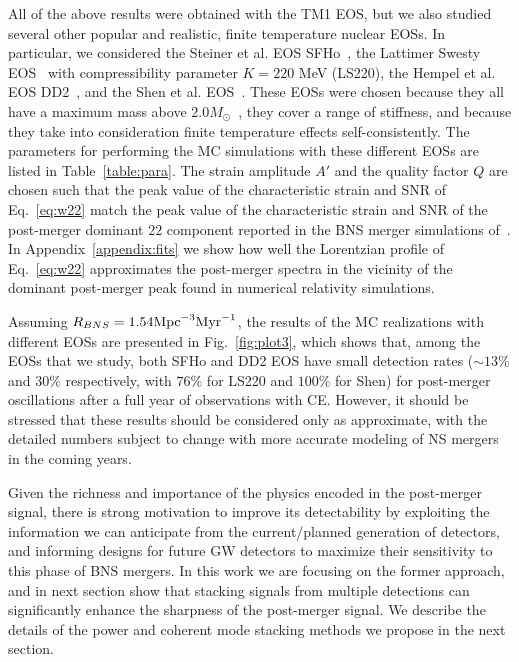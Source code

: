 \documentclass[prd,aps,floatfix,superscriptaddress,nofootinbib,twocolumn,10pt,English]{revtex4-1}
\begin{document}
All of the above results were obtained with the TM1 EOS, but we also
studied several other popular and realistic, finite temperature
nuclear EOSs. In particular, we considered the Steiner et al. EOS
SFHo~\cite{Steiner:2012rk}, the Lattimer Swesty
EOS~\cite{1991NuPhA.535..331L} with compressibility parameter $K=220$
MeV (LS220), the Hempel et al. EOS DD2~\cite{Hempel:2011mk}, and the
Shen et al. EOS~\cite{Shen:2011qu}. These EOSs were chosen because
they all have a maximum mass above
$2.0M_\odot$~\cite{Demorest2010,Antoniadis2013}, they cover a range of
stiffness, and because they take into consideration finite temperature
effects self-consistently. The parameters for performing the MC
simulations with these different EOSs are listed in
Table~\ref{table:para}. The strain amplitude $A'$ and the quality
factor $Q$ are chosen such that the peak value of the characteristic
strain and SNR of Eq.~\eqref{eq:w22} match the peak value of the
characteristic strain and SNR of the post-merger dominant $22$
component reported in the BNS merger simulations
of~\cite{Sekiguchi:2011mc,Stergioulas:2011gd,Palenzuela:2015dqa}. In
Appendix~\ref{appendix:fits} we show how well the Lorentzian profile
of Eq.~\eqref{eq:w22} approximates the post-merger spectra in the
vicinity of the dominant post-merger peak found in numerical
relativity simulations.

Assuming $R_{BNS} = 1.54 {\rm Mpc}^{-3} {\rm Myr}^{-1}$, the results of
the MC realizations with different EOSs are presented in
Fig.~\ref{fig:plot3}, which shows that, among the EOSs that we study,
both SFHo and DD2 EOS have small detection rates ($\sim 13\%$ and $30 \%$ respectively, with $76\%$ for LS220 and $100\%$ for Shen)
for post-merger oscillations after a full year of observations with
CE. However, it should be stressed that these results should
be considered only as approximate, with the detailed numbers subject
to change with more accurate modeling of NS mergers in the coming
years. 


Given the richness and importance of the physics encoded in the
post-merger signal, there is strong motivation to improve its
detectability by exploiting the information we can anticipate from the
current/planned generation of detectors, and informing designs for
future GW detectors to maximize their sensitivity to this phase of BNS
mergers. In this work we are focusing on the former approach, and in
next section show that stacking signals from multiple
detections can significantly enhance the sharpness of the post-merger
signal. We describe the details of the power and coherent mode
stacking methods we propose in the next section.
\end{document}
